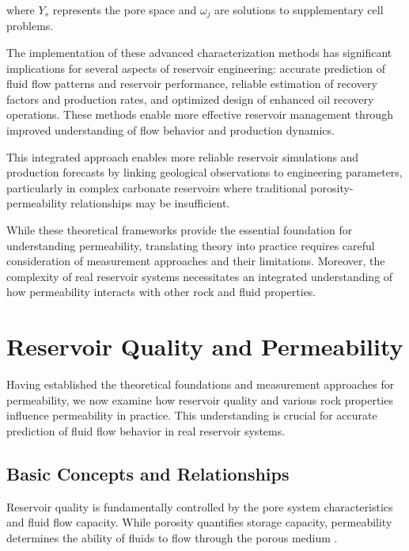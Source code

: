 \documentclass[journal]{IEEEtran}
\begin{document}
where $Y_s$ represents the pore space and $\omega_j$ are solutions to supplementary cell problems.

The implementation of these advanced characterization methods has significant implications for several aspects of reservoir engineering: accurate prediction of fluid flow patterns and reservoir performance, reliable estimation of recovery factors and production rates, and optimized design of enhanced oil recovery operations. These methods enable more effective reservoir management through improved understanding of flow behavior and production dynamics.

This integrated approach enables more reliable reservoir simulations and production forecasts by linking geological observations to engineering parameters, particularly in complex carbonate reservoirs where traditional porosity-permeability relationships may be insufficient.

While these theoretical frameworks provide the essential foundation for understanding permeability, translating theory into practice requires careful consideration of measurement approaches and their limitations. Moreover, the complexity of real reservoir systems necessitates an integrated understanding of how permeability interacts with other rock and fluid properties.

\section{Reservoir Quality and Permeability}

Having established the theoretical foundations and measurement approaches for permeability, we now examine how reservoir quality and various rock properties influence permeability in practice. This understanding is crucial for accurate prediction of fluid flow behavior in real reservoir systems.

\subsection{Basic Concepts and Relationships}
Reservoir quality is fundamentally controlled by the pore system characteristics and fluid flow capacity. While porosity quantifies storage capacity, permeability determines the ability of fluids to flow through the porous medium \parencite{yang_permeabilityporosity_2010}.
\end{document}
